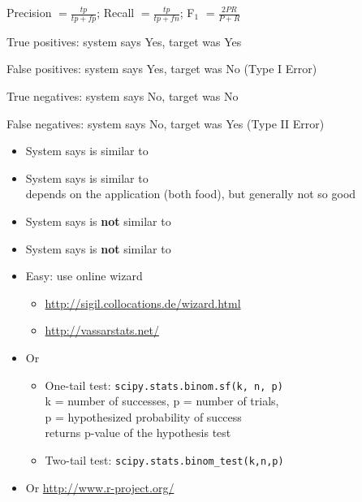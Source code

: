 \documentclass[a4paper,landscape,headrule,footrule,dvips]{foils}
\begin{document}
\begin{CJK}{UTF8}{min}
Precision $=\frac{tp}{tp+fp}$; Recall $=\frac{tp}{tp+fn}$; F$_1$ $=\frac{2PR}{P+R}$


\begin{description} \addtolength{\itemsep}{-1ex}
\item[tp] True positives: system says Yes, target was Yes
\item[fp] False positives: system says Yes, target was No  (Type I Error)
\item[tn] True negatives: system says No, target was No
\item[fn] False negatives: system says No, target was Yes  (Type II Error)
\end{description}


\begin{itemize}
\item System says  is similar to 
  \\  
\item System says  is similar to 
  \\ depends on the application (both food), but generally not so good
  \\ 
\item System says  is \textbf{not} similar to 
  \\ 
\item System says  is \textbf{not} similar to 
  \\ 
\end{itemize}





\begin{itemize}
\item Easy: use online wizard 
  \begin{itemize}
  \item \url{http://sigil.collocations.de/wizard.html}
  \item \url{http://vassarstats.net/}
\end{itemize}
\item Or 
  \begin{itemize}
  \item One-tail test: \texttt{scipy.stats.binom.sf(k, n, p)}
    \\ k = number of successes, p = number of trials, 
    \\ p = hypothesized     probability of success
    \\ returns p-value of the hypothesis test
  \item Two-tail test:  \texttt{scipy.stats.binom\_test(k,n,p)}
  \end{itemize}
\item Or  \url{http://www.r-project.org/}


\end{itemize}
\end{CJK}
\end{document}
